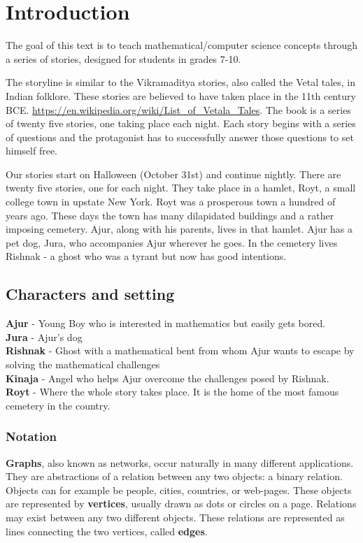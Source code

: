 \chapter{Introduction}
The goal of this text is to teach mathematical/computer science concepts through a series of stories, 
designed for  students in grades 7-10.

The storyline is similar to the Vikramaditya stories, also called the Vetal tales, in Indian folklore. These stories are believed to have taken place in the 11th century BCE. \url{https://en.wikipedia.org/wiki/List_of_Vetala_Tales}. The book is a series of twenty five stories, one taking place each night. Each story begins with a series of questions and the protagonist has to successfully answer those questions to set himself free. 


Our stories start on Halloween (October 31st) and continue nightly. There are twenty five stories, one for each night. They take place in a hamlet, Royt, a small college town in upstate New York. Royt was a prosperous town a hundred of years ago. These days the town has many dilapidated buildings and a rather imposing cemetery. Ajur, along with his parents, lives in that hamlet. Ajur has a pet dog, Jura, who accompanies Ajur wherever he goes.  In the cemetery lives Rishnak - a ghost who was a tyrant but now has good intentions.
\section{Characters and setting}

\textbf {Ajur} - Young Boy who is interested in mathematics but easily gets bored.\\
\noindent
 \textbf {Jura } - Ajur's dog\\
\noindent
\textbf{Rishnak} - Ghost with a mathematical bent from whom Ajur wants to escape by solving the mathematical challenges\\
\noindent
\textbf{Kinaja} - Angel who helps Ajur overcome the challenges posed by Rishnak.\\
\noindent
\textbf{Royt} - Where the whole story takes place. It is the home of the most famous cemetery in the country.

\begin{newpage}
\end{newpage}
\subsection{Notation}
\textbf{Graphs}, also known as networks, occur naturally in many different applications. They are abstractions of a relation between any two objects: a binary relation. Objects can for example be people, cities, countries, or web-pages. These objects are represented by \textbf{vertices}, usually drawn as dots or circles on a page. Relations may exist between any two different objects. These relations are represented as lines connecting the two vertices, called \textbf{edges}.

